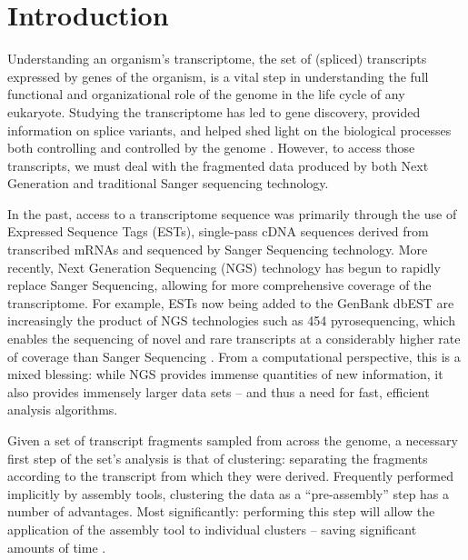 \documentclass[a4,center,fleqn]{NAR}
\begin{document}
\section{Introduction}

Understanding an organism's transcriptome, the set of (spliced)
transcripts expressed by genes of the organism, is a vital step in
understanding the full functional and organizational role of the
genome in the life cycle of any eukaryote.  Studying the transcriptome
has led to gene discovery, provided information on splice variants,  
and helped shed light on the biological processes both controlling and
controlled by the genome \cite{Nagaraj07}.  However, to access those
transcripts, we must deal with the fragmented data produced by
both Next Generation and traditional Sanger sequencing technology.

In the past, access to a transcriptome sequence was primarily
through the use of Expressed Sequence Tags (ESTs), single-pass cDNA
sequences derived from transcribed mRNAs and sequenced by Sanger
Sequencing technology.  More recently, Next Generation Sequencing
(NGS) technology has begun to rapidly replace Sanger Sequencing,
allowing for more comprehensive coverage of the transcriptome.  For
example, ESTs now being added to the GenBank dbEST are increasingly
the product of NGS technologies such as 454 pyrosequencing, which
enables the sequencing of novel and rare transcripts at a considerably
higher rate of coverage than Sanger Sequencing
\cite{Cheung2006,Emrich2007}.  From a computational perspective, this
is a mixed blessing: while NGS provides immense quantities of new
information, it also provides immensely larger data sets -- and thus a
need for fast, efficient analysis algorithms.

\enlargethispage{-65.1pt}

Given a set of transcript fragments sampled from across the genome, a
necessary first step of the set's analysis is that of clustering: separating
the fragments according to the transcript from which they were
derived.  Frequently performed implicitly by assembly tools,
clustering the data as a ``pre-assembly'' step has a number of
advantages.  Most significantly: performing this step will
allow the application of the assembly tool to individual clusters --
saving significant amounts of time \cite{Hazelhurst08a}.  
\end{document}
